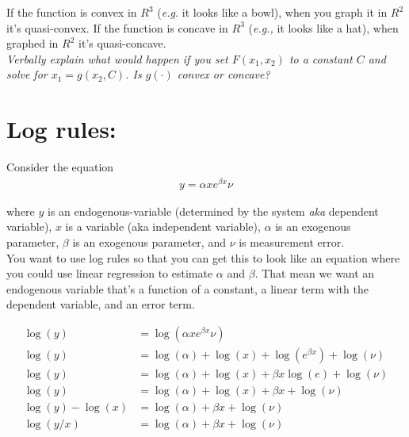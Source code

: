 \documentclass{article}
\begin{document}
If the function is convex in $R^3$ (\textit{e.g.} it looks like a bowl), when you graph it in $R^2$ it's quasi-convex. If the function is concave in $R^3$ (\textit{e.g.,} it looks like a hat), when graphed in $R^2$ it's quasi-concave. \\

\textit{Verbally explain what would happen if you set $ F(x_1, x_2)$ to a constant $C$ and solve for $ x_1 = g(x_2, C)$. Is $g(\cdot)$ convex or concave?}


\section{Log rules:}
Consider the equation 
\begin{align*}
    y = \alpha x e^{\beta x}\nu
\end{align*}

where $y$ is an endogenous-variable (determined by the system \textit{aka} dependent variable), $x$ is a variable (aka independent variable), $\alpha$ is an exogenous parameter, $\beta$ is an exogenous parameter, and $\nu$ is measurement error.\\

You want to use log rules so that you can get this to look like an equation where you could use linear regression to estimate $\alpha$ and $\beta$. That mean we want an endogenous variable that's a function of a constant, a linear term with the dependent variable, and an error term.

\begin{align*}
    \log(y) &= \log(\alpha x e^{\beta x}\nu) \\
    \log(y) &= \log(\alpha) + \log(x) + \log(e^{\beta x}) +\log(\nu)\\
    \log(y) &= \log(\alpha) + \log(x) + \beta x \log(e) + \log(\nu)\\
    \log(y) &= \log(\alpha) + \log(x) + \beta x + \log(\nu)\\
    \log(y) - \log(x) &= \log(\alpha) + \beta x + \log(\nu) \\
    \log(y/x) &= \log(\alpha) + \beta x + \log(\nu)
\end{align*}
\end{document}
